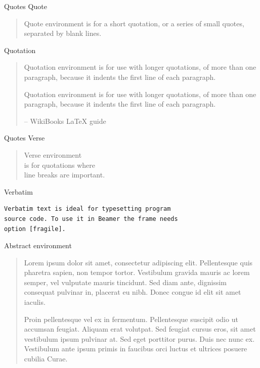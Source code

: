 \documentclass[11pt,t]{beamer}
\begin{document}
\begin{frame}{Quotes}
Quote 
\begin{quote}
	Quote environment is for a short quotation, or a series of small quotes, separated by blank lines.
\end{quote}

\vspace{11pt}
Quotation 
\begin{quotation}
	Quotation environment is for use with longer quotations, of more than one paragraph, because it indents the first line of each paragraph. 

	Quotation environment is for use with longer quotations, of more than one paragraph, because it indents the first line of each paragraph.
	
	\raggedleft	\normalfont --  WikiBooks \LaTeX$ $ guide
\end{quotation}
\end{frame}




\begin{frame}[fragile]{Quotes}
Verse
\begin{verse}
	Verse environment \\ 
	is for quotations where \\
	line breaks are important. 
\end{verse}

\vspace{11pt}
Verbatim
\begin{verbatim}
Verbatim text is ideal for typesetting program
source code. To use it in Beamer the frame needs
option [fragile].
\end{verbatim}
\end{frame}




\begin{frame}
\vspace{15pt}
Abstract environment
\begin{abstract}
	Lorem ipsum dolor sit amet, consectetur adipiscing elit. Pellentesque quis pharetra sapien, non tempor tortor. Vestibulum gravida mauris ac lorem semper, vel vulputate mauris tincidunt. Sed diam ante, dignissim consequat pulvinar in, placerat eu nibh. Donec congue id elit sit amet iaculis.
	
	Proin pellentesque vel ex in fermentum. Pellentesque suscipit odio ut accumsan feugiat. Aliquam erat volutpat. Sed feugiat cursus eros, sit amet vestibulum ipsum pulvinar at. Sed eget porttitor purus. Duis nec nunc ex. Vestibulum ante ipsum primis in faucibus orci luctus et ultrices posuere cubilia Curae.
\end{abstract}
\end{frame}
\end{document}
